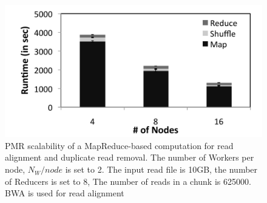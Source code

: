 \documentclass{acm_proc_article-sp}
\begin{document}


\begin{figure}
 \centering
\includegraphics[scale=0.54]{figures/scale-up-bw.pdf} 
\caption{\small PMR scalability of a MapReduce-based computation for
  read alignment and duplicate read removal.  The number of Workers
  per node, $N_{W}/node$ is set to 2.  The input read file is 10GB,
  the number of Reducers is set to 8, The number of reads in a chunk
  is 625000. BWA is used for read alignment}

  \label{fig:scale-p-saga-mr} 
\end{figure}
\end{document}
